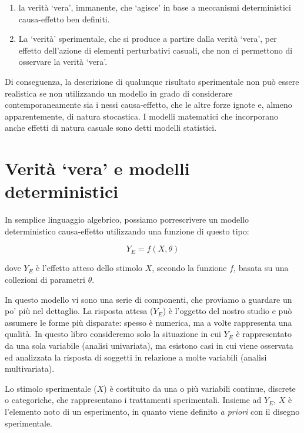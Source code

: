 \documentclass[a4paper,12pt,oneside]{book}
\providecommand{\tightlist}{%
  \setlength{\itemsep}{0pt}\setlength{\parskip}{0pt}}
\begin{document}
\begin{enumerate}
\def\labelenumi{\arabic{enumi}.}
\tightlist
\item
  la verità `vera', immanente, che `agisce' in base a meccanismi deterministici causa-effetto ben definiti.
\item
  La `verità' sperimentale, che si produce a partire dalla verità `vera', per effetto dell'azione di elementi perturbativi casuali, che non ci permettono di osservare la verità `vera'.
\end{enumerate}

Di conseguenza, la descrizione di qualunque risultato sperimentale non può essere realistica se non utilizzando un modello in grado di considerare contemporaneamente sia i nessi causa-effetto, che le altre forze ignote e, almeno apparentemente, di natura stocastica. I modelli matematici che incorporano anche effetti di natura casuale sono detti modelli statistici.

\hypertarget{verituxe0-vera-e-modelli-deterministici}{%
\section{Verità `vera' e modelli deterministici}\label{verituxe0-vera-e-modelli-deterministici}}

In semplice linguaggio algebrico, possiamo porrescrivere un modello deterministico causa-effetto utilizzando una funzione di questo tipo:

\[ Y_E = f(X, \theta) \]

dove \(Y_E\) è l'effetto atteso dello stimolo \(X\), secondo la funzione \(f\), basata su una collezioni di parametri \(\theta\).

In questo modello vi sono una serie di componenti, che proviamo a guardare un po' più nel dettaglio. La risposta attesa (\(Y_E\)) è l'oggetto del nostro studio e può assumere le forme più disparate: spesso è numerica, ma a volte rappresenta una qualità. In questo libro consideremo solo la situazione in cui \(Y_E\) è rappresentato da una sola variabile (analisi univariata), ma esistono casi in cui viene osservata ed analizzata la risposta di soggetti in relazione a molte variabili (analisi multivariata).

Lo stimolo sperimentale (\(X\)) è costituito da una o più variabili continue, discrete o categoriche, che rappresentano i trattamenti sperimentali. Insieme ad \(Y_E\), \(X\) è l'elemento noto di un esperimento, in quanto viene definito \emph{a priori} con il disegno sperimentale.
\end{document}
